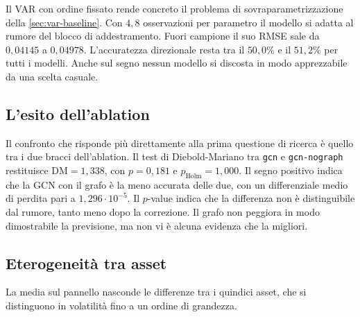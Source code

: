 Il VAR con ordine fissato rende concreto il problema di sovraparametrizzazione della \cref{sec:var-baseline}. Con $4{,}8$ osservazioni per parametro il modello si adatta al rumore del blocco di addestramento. Fuori campione il suo RMSE sale da $0{,}04145$ a $0{,}04978$. L'accuratezza direzionale resta tra il $50{,}0\%$ e il $51{,}2\%$ per tutti i modelli. Anche sul segno nessun modello si discosta in modo apprezzabile da una scelta casuale.

\subsection{L'esito dell'ablation}

Il confronto che risponde più direttamente alla prima questione di ricerca è quello tra i due bracci dell'ablation. Il test di Diebold-Mariano tra \texttt{gcn} e \texttt{gcn-nograph} restituisce $\mathrm{DM}=1{,}338$, con $p=0{,}181$ e $p_{\mathrm{Holm}}=1{,}000$. Il segno positivo indica che la GCN con il grafo è la meno accurata delle due, con un differenziale medio di perdita pari a $1{,}296\cdot10^{-5}$. Il $p$-value indica che la differenza non è distinguibile dal rumore, tanto meno dopo la correzione. Il grafo non peggiora in modo dimostrabile la previsione, ma non vi è alcuna evidenza che la migliori.

\subsection{Eterogeneità tra asset}

La media sul pannello nasconde le differenze tra i quindici asset, che si distinguono in volatilità fino a un ordine di grandezza.

